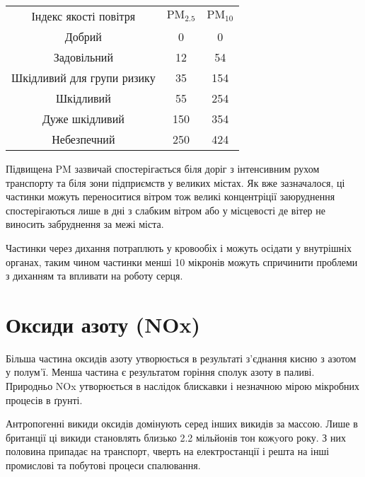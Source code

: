 \begin{center}
    \begin{tabular}{c c c}
        Індекс якості повітря & 
        $\mathrm{PM}_{2.5}$ & $\mathrm{PM}_{10}$ \\
        \cellcolor{green}
        Добрий & 0 & 0\\
        \cellcolor{yellow}
        Задовільний & 12 & 54\\
        \cellcolor{orange}
        Шкідливий для групи ризику & 35 & 154\\
        \cellcolor{red}
        Шкідливий & 55 & 254\\
        \cellcolor{Mahogany}
        Дуже шкідливий & 150 & 354\\
        \cellcolor{Sepia}
        Небезпечний & 250 & 424\\
    \end{tabular}
    
    \vspace{1cm}
\end{center}


Підвищена PM зазвичай спостерігається біля доріг з інтенсивним рухом транспорту та
біля зони підприємств у великих містах. Як вже зазначалося, ці частинки можуть 
переноситися вітром тож великі концентріції заюруднення спостерігаються лише в дні з 
слабким вітром або у місцевості де вітер не виносить забруднення за межі міста.

Частинки через дихання потраплють у кровообіх і можуть осідати у внутрішніх органах, 
таким чином частинки менші 10 мікронів можуть спричинити проблеми з диханням та 
впливати на роботу серця.\cite{noauthor_dusts_nodate}

\section{Оксиди азоту (NOx)}

Більша частина оксидів азоту утворюється в результаті з'єднання кисню з азотом у полум'ї. 
Менша частина є результатом горіння сполук азоту в паливі. Природньо NOx утворюється в наслідок 
блискавки і незначною мірою мікробних процесів в ґрунті.

Антропогенні викиди оксидів домінують серед інших викидів за массою. Лише в британції ці викиди 
становлять близько 2.2 мільйонів тон кожyого року. З них половина припадає на транспорт, 
чверть на електростанції і решта на інші промислові та побутові процеси спалювання.\cite{noauthor_nitrogen_nodate}

